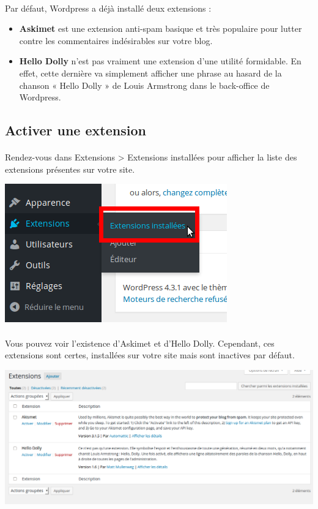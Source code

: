 \documentclass[10pt,a4paper]{article}
\begin{document}
\paragraph{}Par défaut, Wordpress a déjà installé deux extensions :
\begin{itemize}
\item \textbf{Askimet} est une extension anti-spam basique et très populaire pour lutter contre les commentaires indésirables sur votre blog.
\item \textbf{Hello Dolly} n'est pas vraiment une extension d'une utilité formidable. En effet, cette dernière va simplement afficher une phrase au hasard de la chanson « Hello Dolly » de Louis Armstrong dans le back-office de Wordpress.
\end{itemize}
\subsection{Activer une extension}
\paragraph{}Rendez-vous dans Extensions > Extensions installées pour afficher la liste des extensions présentes sur votre site.
\begin{center}
\includegraphics[scale=0.3]{img/0163.png}
\end{center}
\paragraph{}Vous pouvez voir l'existence d'Askimet et d'Hello Dolly. Cependant, ces extensions sont certes, installées sur votre site mais sont inactives par défaut.
\begin{center}
\includegraphics[scale=0.3]{img/0164.png}
\end{center}
\end{document}
